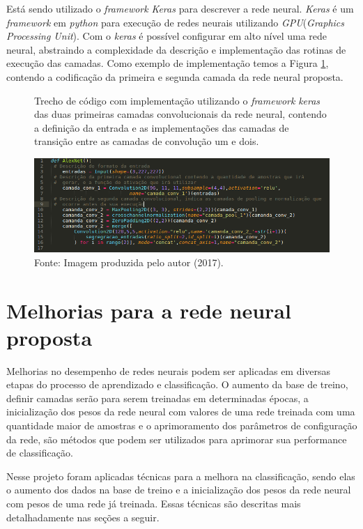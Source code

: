 \par Está sendo utilizado o \textit{framework} \textit{Keras} \cite{chollet2015keras} para descrever a rede neural. \textit{Keras} é um \textit{framework} em \textit{python} para execução de redes neurais utilizando \textit{GPU}(\textit{Graphics Processing Unit}). Com o \textit{keras} é possível configurar em alto nível uma rede neural, abstraindo a complexidade da descrição e implementação das rotinas de execução das camadas. Como exemplo de implementação temos a Figura \ref{fig:conv_keras}, contendo a codificação da primeira e segunda camada da rede neural proposta.

\begin{figure}[H]
  \centering
  \caption{Trecho de código com implementação utilizando o \textit{framework} \textit{keras} das duas primeiras camadas convolucionais da rede neural, contendo a definição da entrada e as implementações das camadas de transição entre as camadas de convolução um e dois.}
  \includegraphics[width=400pt]{dados/figuras/exemplo_keras}
  \caption*{Fonte: Imagem produzida pelo autor (2017).}
  \label{fig:conv_keras}
\end{figure}


\section{Melhorias para a rede neural proposta}

Melhorias no desempenho de redes neurais podem ser aplicadas em diversas etapas do processo de aprendizado e classificação. O aumento da base de treino, definir camadas serão para serem treinadas em determinadas épocas, a inicialização dos pesos da rede neural com valores de uma rede treinada com uma quantidade maior de amostras e o aprimoramento dos parâmetros de configuração da rede, são métodos que podem ser utilizados para aprimorar sua performance de classificação.

\par Nesse projeto foram aplicadas técnicas para a melhora na classificação, sendo elas
o aumento dos dados na base de treino e a inicialização dos pesos da rede neural com pesos de uma rede já treinada. Essas técnicas são descritas mais detalhadamente nas seções a seguir.

